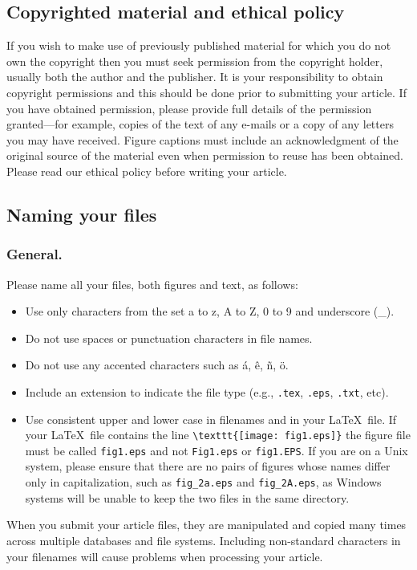 \documentclass[12pt]{iopart}
\begin{document}
\subsection{\label{copyright}Copyrighted material and ethical policy} If you wish to make use of previously published material for which you do not own the copyright then you must seek permission from the copyright holder, usually both the author and the publisher.  It is your responsibility to obtain copyright permissions and this should be done prior to submitting your article. If you have obtained permission, please provide full details of the permission granted---for example, copies of the text of any e-mails or a copy of any letters you may have received. Figure captions must include an acknowledgment of the original source of the material even when permission to reuse has been obtained.  Please read our ethical policy before writing your article.

\subsection{Naming your files}
\subsubsection{General.}
Please name all your files, both figures and text, as follows:
\begin{itemize}
\item Use only characters from the set a to z, A to Z, 0 to 9 and underscore (\_).
\item Do not use spaces or punctuation characters in file names.
\item Do not use any accented characters such as
\'a, \^e, \~n, \"o.
\item Include an extension to indicate the file type (e.g., \verb".tex", \verb".eps", \verb".txt", etc).
\item Use consistent upper and lower case in filenames and in your \LaTeX\ file.
If your \LaTeX\ file contains the line \verb"\texttt{[image: fig1.eps]}" the figure file must be called
\verb"fig1.eps" and not \verb"Fig1.eps" or \verb"fig1.EPS".  If you are on a Unix system, please ensure that
there are no pairs of figures whose names differ only in capitalization, such as \verb"fig_2a.eps" and \verb"fig_2A.eps",
as Windows systems will be unable to keep the two files in the same directory.
\end{itemize}
When you submit your article files, they are manipulated
and copied many times across multiple databases and file systems. Including non-standard
characters in your filenames will cause problems when processing your article.
\end{document}

